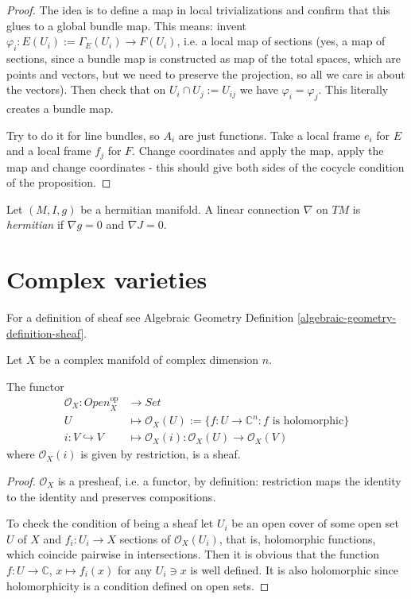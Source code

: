 \begin{proof}
The idea is to define a map in local trivializations
and confirm that this glues to a global bundle map.
This means: invent $\varphi_i:E(U_i):=\Gamma_E(U_i) \to F(U_i)$,
i.e. a local map of sections
(yes, a map of sections, since a bundle map
is constructed as map of the total spaces,
which are points and vectors, 
but we need to preserve the projection,
so all we care is about the vectors).
Then check that on $U_i\cap U_j:= U_{ij}$ 
we have $\varphi_i=\varphi_j$.
This literally creates a bundle map.

Try to do it for line bundles,
so $A_i$ are just functions.
Take a local frame $e_i$ for $E$
and a local frame $f_j$ for $F$.
Change coordinates and apply the map,
apply the map and change coordinates
- this should give both sides of the cocycle condition
of the proposition.
\end{proof}



\begin{definition}
\label{definition-hermitian-connection}
Let $(M,I,g)$ be a hermitian manifold.
A linear connection $\nabla$ on $TM$
is {\it hermitian} if $\nabla g=0$ and $\nabla J=0$.
\end{definition}


\section{Complex varieties}
\label{section-complex-varieties}

For a definition of sheaf
see Algebraic Geometry Definition 
\ref{algebraic-geometry-definition-sheaf}.

\begin{lemma}
\label{lemma-O_X-is-a-sheaf}
Let $X$ be a complex manifold of complex dimension $n$.

The functor
\begin{align*}
\mathcal{O}_X: \mathit{Open}_X^{\text{op}} &\longrightarrow \mathit{Set}
\\
U &\longmapsto \mathcal{O}_X(U):=\{f:U\to \mathbb{C}^n:
f \text{ is holomorphic}\}\\
i:V \hookrightarrow V &\longmapsto 
\mathcal{O}_X(i):\mathcal{O}_X(U) \to \mathcal{O}_X(V)
\end{align*}
where $\mathcal{O}_X(i)$ is given by restriction,
is a sheaf.
\end{lemma}

\begin{proof}
$\mathcal{O}_X$ is a presheaf,
i.e. a functor,
by definition: restriction
maps the identity to the identity
and preserves compositions.

To check the condition of being a sheaf let
$U_i$ be an open cover of some open set $U$ of $X$
and $f_i:U_i \to X$ sections of $\mathcal{O}_X(U_i)$,
that is, holomorphic functions, which
coincide pairwise in intersections.
Then it is obvious that the function $f:U \to \mathbb{C}$,
$x \mapsto f_i(x)$ for any $U_i \ni x$ 
is well defined. It is also holomorphic
since holomorphicity is a condition defined on
open sets.
\end{proof}


